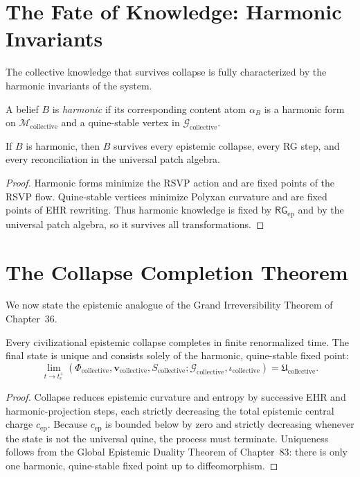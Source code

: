 \section{The Fate of Knowledge: Harmonic Invariants}

The collective knowledge that survives collapse is fully characterized
by the harmonic invariants of the system.

\begin{definition}
A belief $B$ is \emph{harmonic} if its corresponding content atom
$\alpha_B$ is a harmonic form on $\mathcal{M}_{\mathrm{collective}}$ and
a quine-stable vertex in $\mathcal{G}_{\mathrm{collective}}$.
\end{definition}

\begin{proposition}
If $B$ is harmonic, then $B$ survives every epistemic collapse,
every RG step, and every reconciliation in the universal patch algebra.
\end{proposition}

\begin{proof}
Harmonic forms minimize the RSVP action and are fixed points of the RSVP
flow.  
Quine-stable vertices minimize Polyxan curvature and are fixed points of
EHR rewriting.  
Thus harmonic knowledge is fixed by $\mathsf{RG}_{\mathrm{ep}}$ and by
the universal patch algebra, so it survives all transformations.
\end{proof}

\section{The Collapse Completion Theorem}

We now state the epistemic analogue of the Grand Irreversibility
Theorem of Chapter~36.

\begin{theorem}
Every civilizational epistemic collapse completes in finite renormalized
time.  
The final state is unique and consists solely of the harmonic,
quine-stable fixed point:
\[
\lim_{t\to t_c^+}
(\Phi_{\mathrm{collective}}, \mathbf{v}_{\mathrm{collective}},
 S_{\mathrm{collective}}; \mathcal{G}_{\mathrm{collective}},
 \iota_{\mathrm{collective}})
=
\mathfrak{U}_{\mathrm{collective}}.
\]
\end{theorem}

\begin{proof}
Collapse reduces epistemic curvature and entropy by successive EHR and
harmonic-projection steps, each strictly decreasing the total epistemic
central charge $c_{\mathrm{ep}}$.  
Because $c_{\mathrm{ep}}$ is bounded below by zero and strictly
decreasing whenever the state is not the universal quine, the process
must terminate.  
Uniqueness follows from the Global Epistemic Duality Theorem of
Chapter~83: there is only one harmonic, quine-stable fixed point up to
diffeomorphism.
\end{proof}

